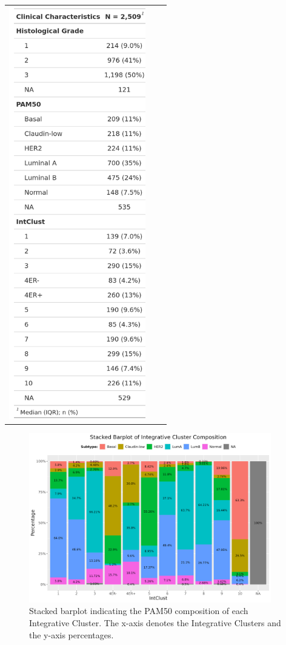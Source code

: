\begin{table}[!h]
\begin{minipage}[c]{0.5\textwidth}
\begin{tabular}{ccc}
\includegraphics[height = 18cm]{../tables/Introduction/Table1_Clin_pt2.png}
\end{tabular}
\end{minipage}
\label{Clinchar}
\end{table}
\vfill 
\clearpage

\begin{figure}[H]
\center
\includegraphics[width=0.94\textwidth]{../figures/Introduction/IntClust_Composition.png}
\caption[Stacked barplot indicating the PAM50 composition of each Integrative Cluster.]{Stacked barplot indicating the PAM50 composition of each Integrative Cluster. The x-axis denotes the Integrative Clusters and the y-axis percentages.}
\label{fig:Comp}
\end{figure} 

